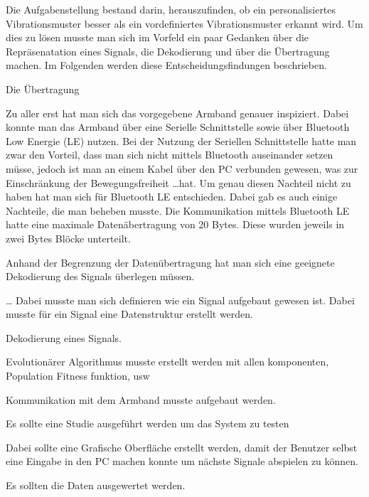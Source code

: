 
Die Aufgabenstellung bestand darin, herauszufinden, ob ein personalisiertes Vibrationsmuster besser als ein vordefiniertes Vibrationsmuster erkannt wird.
Um dies zu l{\"o}sen musste man sich im Vorfeld ein paar Gedanken {\"u}ber die Repr{\"a}senatation eines Signals, die Dekodierung und {\"u}ber die {\"U}bertragung machen.
Im Folgenden werden diese Entscheidungsfindungen beschrieben.

Die {\"U}bertragung

Zu aller erst hat man sich das vorgegebene Armband genauer inspiziert. Dabei konnte man das Armband {\"u}ber eine Serielle Schnittstelle sowie {\"u}ber Bluetooth Low Energie (LE) nutzen. 
Bei der Nutzung der Seriellen Schnittstelle hatte man zwar den Vorteil, dass man sich nicht mittels Bluetooth auseinander setzen müsse, jedoch ist man an einem Kabel {\"u}ber den PC verbunden gewesen, was zur Einschr{\"a}nkung der Bewegungsfreiheit \dots hat. Um genau diesen Nachteil nicht zu haben hat man sich f{\"u}r Bluetooth LE entschieden. Dabei gab es auch einige Nachteile, die man beheben musste. Die Kommunikation mittels Bluetooth LE hatte eine maximale Daten{\"a}bertragung von 20 Bytes. Diese wurden jeweils in zwei Bytes Bl{\"o}cke unterteilt.

Anhand der Begrenzung der Daten{\"u}bertragung hat man sich eine geeignete Dekodierung des Signals {\"u}berlegen m{\"u}ssen. 











\dots
Dabei musste man sich definieren wie ein Signal aufgebaut gewesen ist. Dabei musste f{\"u}r ein Signal eine Datenstruktur erstellt werden. 



Dekodierung eines Signals.

Evolution{\"a}rer Algorithmus musste erstellt werden mit allen komponenten, Population Fitness funktion, usw

Kommunikation mit dem Armband musste aufgebaut werden. 

Es sollte eine Studie ausgef{\"u}hrt werden um das System zu testen 

Dabei sollte eine Grafische Oberfl{\"a}che erstellt werden, damit der Benutzer selbst eine Eingabe in den PC machen konnte um n{\"a}chste Signale abspielen zu k{\"o}nnen.

Es sollten die Daten ausgewertet werden.
